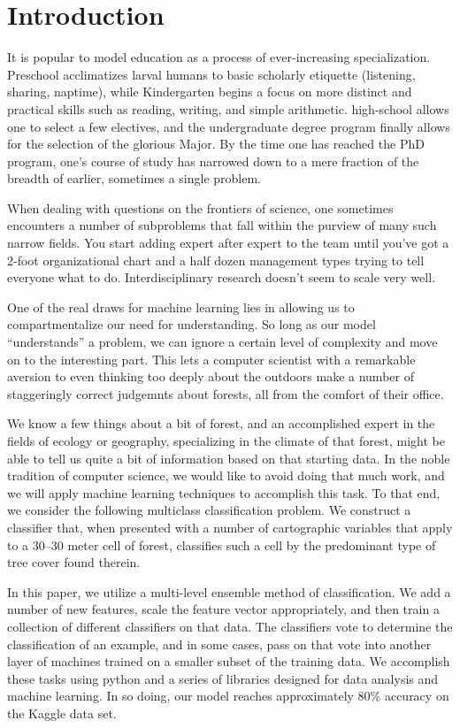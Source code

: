\section{Introduction}
\label{sec:-intro}

It is popular to model education as a process of ever-increasing 
specialization.  Preschool acclimatizes larval humans to basic 
scholarly etiquette (listening, sharing, naptime), while Kindergarten 
begins a focus on more distinct and practical skills such as reading, 
writing, and simple arithmetic.  high-school allows one to select a few 
electives, and the undergraduate degree program finally allows for the 
selection of the glorious Major.  By the time one has reached the PhD 
program, one's course of study has narrowed down to a mere fraction of 
the breadth of earlier, sometimes a single problem.

When dealing with questions on the frontiers of science, one sometimes 
encounters a number of subproblems that fall within the purview of many 
such narrow fields.  You start adding expert after expert to the team 
until you've got a 2-foot organizational chart and a half dozen 
management types trying to tell everyone what to do.  Interdisciplinary 
research doesn't seem to scale very well.

One of the real draws for machine learning lies in allowing us to 
compartmentalize our need for understanding.  So long as our model 
``understands'' a problem, we can ignore a certain level of complexity 
and move on to the interesting part.  This lets a computer scientist 
with a remarkable aversion to even thinking too deeply about the 
outdoors make a number of staggeringly correct judgemnts about forests, 
all from the comfort of their office.

We know a few things about a bit of forest, and an accomplished expert 
in the fields of ecology or geography, specializing in the climate of 
that forest, might be able to tell us quite a bit of information based 
on that starting data.  In the noble tradition of computer science, we 
would like to avoid doing that much work, and we will apply machine 
learning techniques to accomplish this task.  To that end, we consider 
the following multiclass classification problem. We construct a 
classifier that, when presented with a number of cartographic variables 
that apply to a 30--30 meter cell of forest, classifies such a cell by 
the predominant type of tree cover found therein.

In this paper, we utilize a multi-level ensemble method of 
classification.  We add a number of new features, scale the feature 
vector appropriately, and then train a collection of different 
classifiers on that data.  The classifiers vote to determine the 
classification of an example, and in some cases, pass on that vote into 
another layer of machines trained on a smaller subset of the training 
data.  We accomplish these tasks using python and a series of libraries 
designed for data analysis and machine learning.  In so doing, our model 
reaches approximately 80\% accuracy on the Kaggle data set. 






